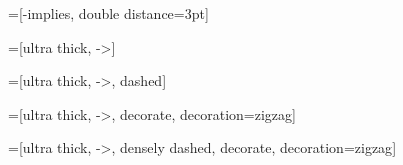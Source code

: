 =[-implies, double distance=3pt]

=[ultra thick, ->]

=[ultra thick, ->, dashed]

=[ultra thick, ->, decorate, decoration={zigzag}]

=[ultra thick, ->, densely dashed, decorate, decoration={zigzag}]

\newcommand{\inode}[3][]{
  \node[draw, shape=circle, minimum width=0.6cm] (#2) at (#3) {};
  \node[fill, shape=circle, #1] () at (#3) {};
}

\newcommand{\dnode}[3][]{
  \node[draw, dashed, shape=circle, minimum width=0.6cm] (#2) at (#3) {};
  \node[fill, shape=circle, #1] () at (#3) {};
}

\newcommand{\nnode}[3][]{
  \node[fill, shape=circle, #1] (#2) at (#3) {};
}

